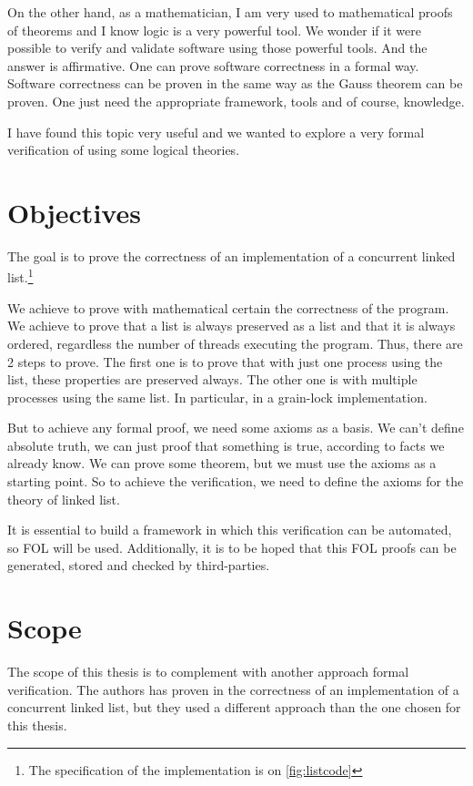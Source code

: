 On the other hand, as a mathematician, I am very used to mathematical proofs of theorems and I know logic is a very powerful tool.
%
We wonder if it were possible to verify and validate software using those powerful tools.
%
And the answer is affirmative.
%
One can prove software correctness in a formal way.
% 
Software correctness can be proven in the same way as the Gauss theorem can be proven.
%
One just need the appropriate framework, tools and of course, knowledge.


I have found this topic very useful and we wanted to explore a very formal verification of using some logical theories.


\section{Objectives}

The goal is to prove the correctness of an implementation of a concurrent linked list.\footnote{The specification of the implementation is on \ref{fig:listcode}}

We achieve to prove with mathematical certain the correctness of the program. 
%
We achieve to prove that a list is always preserved as a list and that it is always ordered, regardless the number of threads executing the program.
%
Thus, there are 2 steps to prove. 
%
The first one is to prove that with just one process using the list, these properties are preserved always. 
%
The other one is with multiple processes using the same list. 
%
In particular, in a grain-lock implementation.

But to achieve any formal proof, we need some axioms as a basis.
%
We can't define absolute truth, we can just proof that something is true, according to facts we already know. 
%
We can prove some theorem, but we must use the axioms as a starting point. 
%
So to achieve the verification, we need to define the axioms for the theory of linked list.

It is essential to build a framework in which this verification can be automated, so \gls{FOL} will be used. 
%
Additionally, it is to be hoped that this \gls{FOL} proofs can be generated, stored and checked by third-parties.


\section{Scope}

The scope of this thesis is to complement \cite{thesisAle} with another approach formal verification. 
%
The authors has proven in \cite{thesisAle} the correctness of an implementation of a concurrent linked list, but they used a different approach than the one chosen for this thesis.


